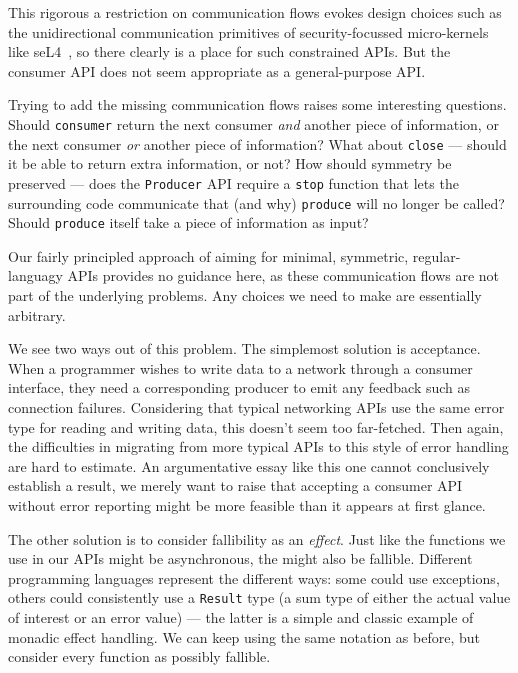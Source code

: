 \documentclass[sigplan,screen,10pt,anonymous,review]{acmart}
\begin{document}
This rigorous a restriction on communication flows evokes design choices such as the unidirectional communication primitives of security-focussed micro-kernels like seL4~\cite{murray2013sel4}, so there clearly is a place for such constrained APIs. But the consumer API does not seem appropriate as a general-purpose API.

Trying to add the missing communication flows raises some interesting questions. Should \texttt{consumer} return the next consumer \textit{and} another piece of information, or the next consumer \textit{or} another piece of information? What about \texttt{close} --- should it be able to return extra information, or not? How should symmetry be preserved --- does the \texttt{Producer} API require a \texttt{stop} function that lets the surrounding code communicate that (and why) \texttt{produce} will no longer be called? Should \texttt{produce} itself take a piece of information as input?

Our fairly principled approach of aiming for  minimal, symmetric, regular-languagy APIs provides no guidance here, as these communication flows are not part of the underlying problems. Any choices we need to make are essentially arbitrary.

We see two ways out of this problem. The simplemost solution is acceptance. When a programmer wishes to write data to a network through a consumer interface, they need a corresponding producer to emit any feedback such as connection failures. Considering that typical networking APIs use the same error type for reading and writing data, this doesn't seem too far-fetched. Then again, the difficulties in migrating from more typical APIs to this style of error handling are hard to estimate. An argumentative essay like this one cannot conclusively establish a result, we merely want to raise that accepting a consumer API without error reporting might be more feasible than it appears at first glance.

The other solution is to consider fallibility as an \textit{effect}. Just like the functions we use in our APIs might be asynchronous, the might also be fallible. Different programming languages represent the different ways: some could use exceptions, others could consistently use a \texttt{Result} type (a sum type of either the actual value of interest or an error value) --- the latter is a simple and classic example of monadic effect handling. We can keep using the same notation as before, but consider every function as possibly fallible.
\end{document}
